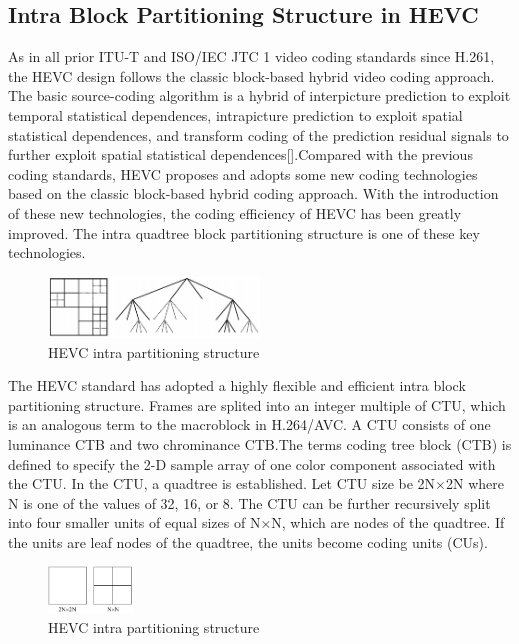 \documentclass[journal,sort]{IEEEtran}
\begin{document}
\subsection{Intra Block Partitioning Structure in HEVC }
As in all prior ITU-T and ISO/IEC JTC 1 video coding
standards since H.261, the HEVC design follows the
classic block-based hybrid video coding approach. The basic source-coding algorithm is a hybrid
of interpicture prediction to exploit temporal statistical dependences,
intrapicture prediction to exploit spatial statistical
dependences, and transform coding of the prediction residual
signals to further exploit spatial statistical dependences[].Compared with the previous coding standards, HEVC proposes and adopts some new coding technologies based on  the classic block-based hybrid coding approach. With the introduction of these new technologies, the coding efficiency of HEVC has been greatly improved. The intra quadtree block partitioning structure is one of these key technologies.


\begin{figure}[htbp!]
	\centering
	\includegraphics[width=0.5\textwidth]{1.png}
	\caption{HEVC intra partitioning structure}
	\label{HEVC-part}
\end{figure}
The HEVC standard has adopted a highly flexible and efficient intra block partitioning structure. Frames are splited into an integer multiple of CTU, which is an analogous term to the macroblock in H.264/AVC. A CTU consists of one luminance CTB and two chrominance CTB.The terms coding
tree block (CTB) is defined to specify the 2-D sample array of one color component associated with the CTU. In the CTU, a quadtree is established. Let CTU size be 2N$\times$2N where N is one of the values of 32, 16, or 8. The CTU can be further recursively split into four smaller units of equal sizes of N$\times$N, which are nodes of the quadtree. If the
units are leaf nodes of the quadtree, the units become coding units (CUs).

\begin{figure}[htbp!]
	\centering
	\includegraphics[width=0.2\textwidth]{2.png}
	\caption{HEVC intra partitioning structure}
	\label{HEVC-part}
\end{figure}
\end{document}
